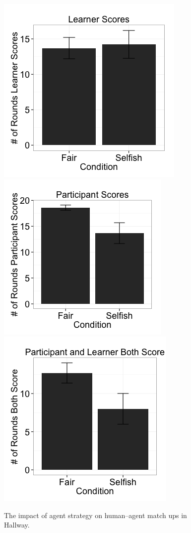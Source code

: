 \documentclass[letterpaper]{article}
\begin{document}
\begin{figure}
\centering
\includegraphics[width=0.6\columnwidth]{figures/learnergoals.png}
\includegraphics[width=0.6\columnwidth]{figures/humangoals.png}
\includegraphics[width=0.6\columnwidth]{figures/bothgoals.png}
\caption{The impact of agent strategy on human--agent match ups in Hallway.}
\label{f:people}
\end{figure}
\end{document}
